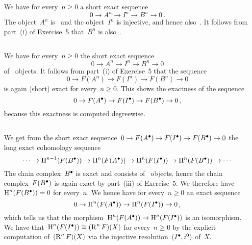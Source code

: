 We have for every~$n \geq 0$ a short exact sequence
\[
  0
  \to
  A^n
  \to
  I^n
  \to
  B^n
  \to
  0 \,.
\]
The object~$A^n$ is~ and the object~$I^n$ is injective, and hence also~.
It follows from part~(i) of Exercise~5 that~$B^n$ is also~.





\subsection{}

We have for every~$n \geq 0$ the short exact sequence
\[
  0
  \to
  A^n
  \to
  I^n
  \to
  B^n
  \to
  0
\]
of~ objects.
It follows from part~(i) of Exercise~5 that the sequence
\[
  0
  \to
  F(A^n)
  \to
  F(I^n)
  \to
  F(B^n)
  \to
  0
\]
is again (short) exact for every~$n \geq 0$.
This shows the exactness of the sequence
\[
  0 
  \to
  F(A^\bullet)
  \to
  F(I^\bullet)
  \to
  F(B^\bullet)
  \to
  0 \,,
\]
because this exactness is computed degreewise.





\subsection{}

We get from the short exact sequence~$0 \to F(A^\bullet) \to F(I^\bullet) \to F(B^\bullet) \to 0$ the long exact cohomology sequence
\[
  \dotsb
  \to
  \operatorname{H}^{n-1}(F(B^\bullet))
  \to
  \operatorname{H}^n(F(A^\bullet))
  \to
  \operatorname{H}^n(F(I^\bullet))
  \to
  \operatorname{H}^n(F(B^\bullet))
  \to
  \dotsb
\]
The chain complex~$B^\bullet$ is exact and consists of~ objects, hence the chain complex~$F(B^\bullet)$ is again exact by part~(iii) of Exercise~5.
We therefore have~$\operatorname{H}^n(F(B^\bullet)) = 0$ for every~$n$.
We hence have for every~$n \geq 0$ an exact sequence
\[
  0
  \to
  \operatorname{H}^n(F(A^\bullet))
  \to
  \operatorname{H}^n(F(I^\bullet))
  \to
  0 \,,
\]
which tells us that the morphism~$\operatorname{H}^n(F(A^\bullet)) \to \operatorname{H}^n(F(I^\bullet))$ is an isomorphism.
We have that~$\operatorname{H}^n(F(I^\bullet)) \cong (\operatorname{R}^n F)(X)$ for every~$n \geq 0$ by the explicit computation of~$(\operatorname{R}^n F)(X)$ via the injective resolution~$(I^\bullet, i^0)$ of~$X$.









